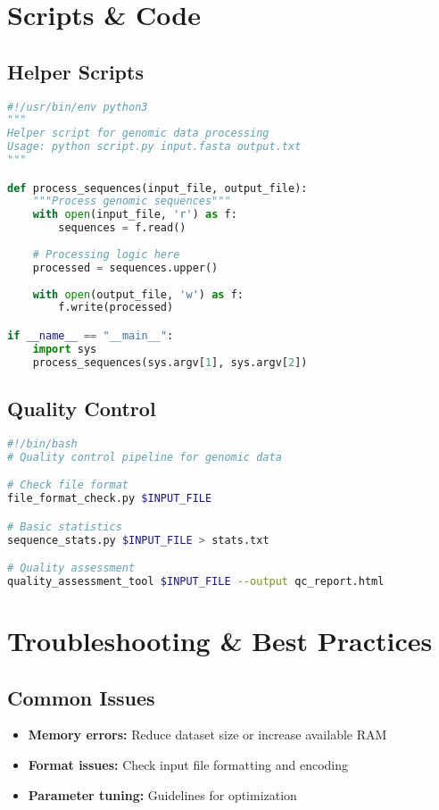 \documentclass[a4paper,11pt]{article}
\begin{document}
\section{Scripts \& Code}

\subsection{Helper Scripts}
\begin{lstlisting}[language=Python, caption=Data processing script]
#!/usr/bin/env python3
"""
Helper script for genomic data processing
Usage: python script.py input.fasta output.txt
"""

def process_sequences(input_file, output_file):
    """Process genomic sequences"""
    with open(input_file, 'r') as f:
        sequences = f.read()
    
    # Processing logic here
    processed = sequences.upper()
    
    with open(output_file, 'w') as f:
        f.write(processed)

if __name__ == "__main__":
    import sys
    process_sequences(sys.argv[1], sys.argv[2])
\end{lstlisting}

\subsection{Quality Control}
\begin{lstlisting}[language=bash, caption=QC pipeline]
#!/bin/bash
# Quality control pipeline for genomic data

# Check file format
file_format_check.py $INPUT_FILE

# Basic statistics
sequence_stats.py $INPUT_FILE > stats.txt

# Quality assessment
quality_assessment_tool $INPUT_FILE --output qc_report.html
\end{lstlisting}

\section{Troubleshooting \& Best Practices}

\subsection{Common Issues}

\begin{itemize}
    \item \textbf{Memory errors:} Reduce dataset size or increase available RAM
    \item \textbf{Format issues:} Check input file formatting and encoding
    \item \textbf{Parameter tuning:} Guidelines for optimization
\end{itemize}
\end{document}
